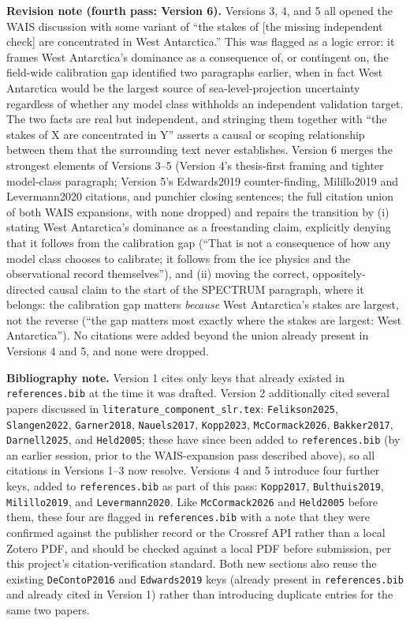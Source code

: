 \documentclass[12pt]{article}
\begin{document}
\noindent\textbf{Revision note (fourth pass: Version 6).} Versions 3, 4,
and 5 all opened the WAIS discussion with some variant of ``the stakes of
[the missing independent check] are concentrated in West Antarctica.''
This was flagged as a logic error: it frames West Antarctica's dominance
as a consequence of, or contingent on, the field-wide calibration gap
identified two paragraphs earlier, when in fact West Antarctica would be
the largest source of sea-level-projection uncertainty regardless of
whether any model class withholds an independent validation target. The
two facts are real but independent, and stringing them together with
``the stakes of X are concentrated in Y'' asserts a causal or scoping
relationship between them that the surrounding text never establishes.
Version 6 merges the strongest elements of Versions 3--5 (Version 4's
thesis-first framing and tighter model-class paragraph; Version 5's
Edwards2019 counter-finding, Milillo2019 and Levermann2020 citations, and
punchier closing sentences; the full citation union of both WAIS
expansions, with none dropped) and repairs the transition by (i) stating
West Antarctica's dominance as a freestanding claim, explicitly denying
that it follows from the calibration gap (``That is not a consequence of
how any model class chooses to calibrate; it follows from the ice
physics and the observational record themselves''), and (ii) moving the
correct, oppositely-directed causal claim to the start of the SPECTRUM
paragraph, where it belongs: the calibration gap matters \emph{because}
West Antarctica's stakes are largest, not the reverse (``the gap matters
most exactly where the stakes are largest: West Antarctica''). No
citations were added beyond the union already present in Versions 4 and
5, and none were dropped.

\noindent\textbf{Bibliography note.} Version 1 cites only keys that
already existed in \texttt{references.bib} at the time it was drafted.
Version 2 additionally cited several papers discussed in
\texttt{literature\_component\_slr.tex}: \texttt{Felikson2025},
\texttt{Slangen2022}, \texttt{Garner2018}, \texttt{Nauels2017},
\texttt{Kopp2023}, \texttt{McCormack2026}, \texttt{Bakker2017},
\texttt{Darnell2025}, and \texttt{Held2005}; these have since been added to
\texttt{references.bib} (by an earlier session, prior to the WAIS-expansion
pass described above), so all citations in Versions 1--3 now resolve.
Versions 4 and 5 introduce four further keys, added to
\texttt{references.bib} as part of this pass: \texttt{Kopp2017},
\texttt{Bulthuis2019}, \texttt{Milillo2019}, and \texttt{Levermann2020}.
Like \texttt{McCormack2026} and \texttt{Held2005} before them, these four
are flagged in \texttt{references.bib} with a note that they were
confirmed against the publisher record or the Crossref API rather than a
local Zotero PDF, and should be checked against a local PDF before
submission, per this project's citation-verification standard. Both new
sections also reuse the existing \texttt{DeContoP2016} and
\texttt{Edwards2019} keys (already present in \texttt{references.bib} and
already cited in Version 1) rather than introducing duplicate entries for
the same two papers.
\end{document}
